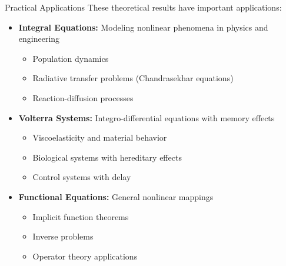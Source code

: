 \documentclass[aspectratio=169,10pt]{beamer}
\begin{document}
\begin{frame}{Practical Applications}{}
These theoretical results have important applications:

\begin{itemize}
    \item \textbf{Integral Equations:} Modeling nonlinear phenomena in physics and engineering
    \begin{itemize}
        \item Population dynamics
        \item Radiative transfer problems (Chandrasekhar equations)
        \item Reaction-diffusion processes
    \end{itemize}

    \medskip
    \item \textbf{Volterra Systems:} Integro-differential equations with memory effects
    \begin{itemize}
        \item Viscoelasticity and material behavior
        \item Biological systems with hereditary effects
        \item Control systems with delay
    \end{itemize}

    \medskip
    \item \textbf{Functional Equations:} General nonlinear mappings
    \begin{itemize}
        \item Implicit function theorems
        \item Inverse problems
        \item Operator theory applications
    \end{itemize}
\end{itemize}
\end{frame}
\end{document}
